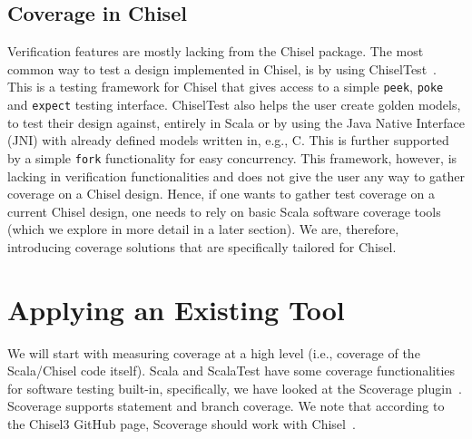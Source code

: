 \documentclass[conference]{IEEEtran}
\newcommand{\martin}[1]{{\color{blue} Martin: #1}}
\begin{document}
\subsection{Coverage in Chisel} 
Verification features are mostly lacking from the Chisel package. 
The most common way to test a design implemented in Chisel, is by using ChiselTest~\cite{chisel:tester2}. 
This is a testing framework for Chisel that gives access to a simple \texttt{peek}, \texttt{poke} and \texttt{expect} testing interface. 
ChiselTest also helps the user create golden models, to test their design against, entirely in Scala or by using the Java Native Interface (JNI) with already defined models written in, e.g., C. This is further supported by a simple \texttt{fork} functionality for easy concurrency.  
This framework, however, is lacking in verification functionalities and does not give the user any way to gather coverage on a Chisel design.
Hence, if one wants to gather test coverage on a current Chisel design, one needs to rely on basic Scala software coverage tools (which we explore in more detail in a later section). 
We are, therefore, introducing coverage solutions that are specifically tailored for Chisel.

\section{Applying an Existing Tool}
We will start with measuring coverage at a high level (i.e., coverage of the Scala/Chisel code itself). Scala and ScalaTest have some coverage functionalities for software testing built-in, specifically, we have looked at the Scoverage plugin~\cite{scoverage}. Scoverage supports statement and branch coverage. We note that according to the Chisel3 GitHub page, Scoverage should work with Chisel~\cite{chisel:scoverage}.

\end{document}
